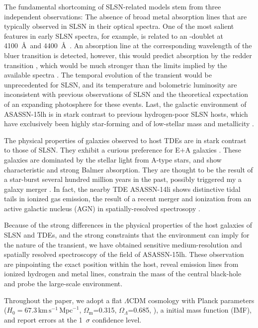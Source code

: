 \documentclass[traditabstract]{aa}
\begin{document}
The fundamental shortcoming of SLSN-related models stem from three independent observations: The absence of broad metal absorption lines that are typically observed in SLSN in their optical spectra. One of the most salient features in early SLSN spectra, for example, is related to an -doublet at 4100~\AA~and 4400~\AA~\citep{2011Natur.474..487Q}. An absorption line at the corresponding wavelength of the bluer  transition is detected, however, this would predict absorption by the redder transition \citep{2016MNRAS.458.3455M}, which would be much stronger than the limits implied by the available spectra \citep{2016NatAs...1E...2L, 2017ApJ...836...25M}. The temporal evolution of the transient would be unprecedented for SLSN, and its temperature and bolometric luminosity are inconsistent with previous observations of SLSN and the theoretical expectation of an expanding photosphere for these events. Last, the galactic environment of ASASSN-15lh is in stark contrast to previous hydrogen-poor SLSN hosts, which have exclusively been highly star-forming and of low-stellar mass and metallicity \citep{2015MNRAS.449..917L, 2016ApJ...830...13P, 2016arXiv160504925C}.

The physical properties of galaxies observed to host TDEs are in stark contrast to those of SLSN. They exhibit a curious preference  \citep{2014ApJ...793...38A, 2016ApJ...818L..21F} for E+A galaxies \citep{1996ApJ...466..104Z}. These galaxies are dominated by the stellar light from A-type stars, and show characteristic and strong Balmer absorption. They are thought to be the result of a star-burst several hundred million years in the past, possibly triggered my a galaxy merger \citep{1996ApJ...466..104Z}. In fact, the nearby TDE ASASSN-14li shows distinctive tidal tails in ionized gas emission, the result of a recent merger and ionization from an active galactic nucleus (AGN) in spatially-resolved spectrosopy \citep{2016ApJ...830L..32P}.

Because of the strong differences in the physical properties of the host galaxies of SLSN and TDEs, and the strong constraints that the environment can imply for the nature of the transient, we have obtained sensitive medium-resolution and spatially resolved spectroscopy of the field of ASASSN-15lh. These observation are pinpointing the exact position within the host, reveal emission lines from ionized hydrogen and metal lines, constrain the mass of the central black-hole and probe the large-scale environment.

Throughout the paper, we adopt a flat $\Lambda$CDM cosmology with Planck parameters ($H_0=67.3\,\mathrm{km}\,\mathrm{s}^{-1}\,\mathrm{Mpc}^{-1}$, $\Omega_\mathrm{m}$=0.315, $\Omega_\Lambda$=0.685, \citealt{2014A&A...571A..16P}), a \citet{2003PASP..115..763C} initial mass function (IMF), and report errors at the 1~$\sigma$ confidence level.
\end{document}
